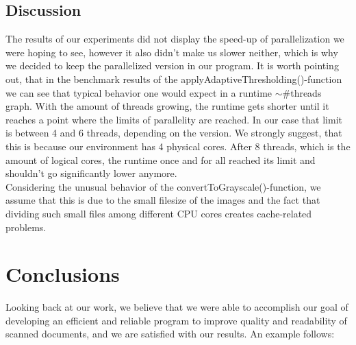 \documentclass[sigconf]{acmart}
\begin{document}
\subsection{Discussion}

The results of our experiments did not display the speed-up of parallelization we were hoping to see, however it also didn't make us slower neither, which is why we decided to keep the parallelized version in our program. It is worth pointing out, that in the benchmark results of the applyAdaptiveThresholding()-function we can see that typical behavior one would expect in a runtime $\sim\#$threads graph. With the amount of threads growing, the runtime gets shorter until it reaches a point where the limits of parallelity are reached. In our case that limit is between 4 and 6 threads, depending on the version. We strongly suggest, that this is because our environment has 4 physical cores. After 8 threads, which is the amount of logical cores, the runtime once and for all reached its limit and shouldn't go significantly lower anymore.\\
Considering the unusual behavior of the convertToGrayscale()-function, we assume that this is due to the small filesize of the images and the fact that dividing such small files among different CPU cores creates cache-related problems. 


\section{Conclusions}

Looking back at our work, we believe that we were able to accomplish our goal of developing an efficient and reliable program to improve quality and readability of scanned documents, and we are satisfied with our results. An example follows:\\
\end{document}
